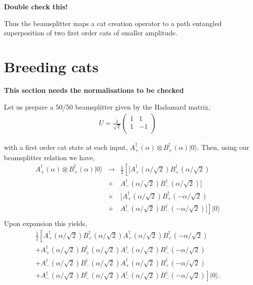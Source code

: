 \documentclass[aps,prl,twocolumn,amsmath,amssymb,nofootinbib,superscriptaddress]{revtex4}
\newcommand{\ket}[1]{|#1\rangle}
\begin{document}
\textbf{Double check this!}

Thus the beamsplitter maps a cat creation operator to a path entangled superposition of two first order cats of smaller amplitude.

\section{Breeding cats}

\textbf{This section needs the normalisations to be checked}

Let us prepare a 50/50 beamsplitter given by the Hadamard matrix,
\begin{eqnarray}
U = \frac{1}{\sqrt{2}} \left( \begin{array}{cc}
1 & 1 \\
1 & -1 \\
\end{array} \right)
\end{eqnarray}

with a first order cat state at each input, $A_+^\dag(\alpha)\otimes B_+^\dag(\alpha)\ket{0}$. Then, using our beamsplitter relation we have,
\begin{eqnarray}
A_+^\dag(\alpha)\otimes B_+^\dag(\alpha)\ket{0} &\to&\frac{1}{2}\left[[A_+^\dag(\alpha/\sqrt{2}) B_+^\dag(\alpha/\sqrt{2}) \right.\nonumber \\
&+& A_-^\dag(\alpha/\sqrt{2}) B_-^\dag(\alpha/\sqrt{2})] \nonumber\\
&\times& [A_+^\dag(\alpha/\sqrt{2}) B_+^\dag(-\alpha/\sqrt{2}) \nonumber \\
&+& \left.A_-^\dag(\alpha/\sqrt{2})B_-^\dag(-\alpha/\sqrt{2})]\right]\ket{0} \nonumber \\
\end{eqnarray}
Upon expansion this yields,
\begin{eqnarray}
\frac{1}{2}\left[A_+^\dag(\alpha/\sqrt{2}) B_+^\dag(\alpha/\sqrt{2}) A_+^\dag(\alpha/\sqrt{2}) B_+^\dag(-\alpha/\sqrt{2}) \right. \nonumber \\
+ A_+^\dag(\alpha/\sqrt{2}) B_+^\dag(\alpha/\sqrt{2}) A_-^\dag(\alpha/\sqrt{2})B_-^\dag(-\alpha/\sqrt{2}) \nonumber \\
+ A_-^\dag(\alpha/\sqrt{2})B_-^\dag(\alpha/\sqrt{2}) A_+^\dag(\alpha/\sqrt{2}) B_+^\dag(-\alpha/\sqrt{2}) \nonumber \\
\left. + A_-^\dag(\alpha/\sqrt{2})B_-^\dag(\alpha/\sqrt{2})A_-^\dag(\alpha/\sqrt{2})B_-^\dag(-\alpha/\sqrt{2}) \right]\ket{0}.\nonumber \\
\end{eqnarray}
\end{document}
